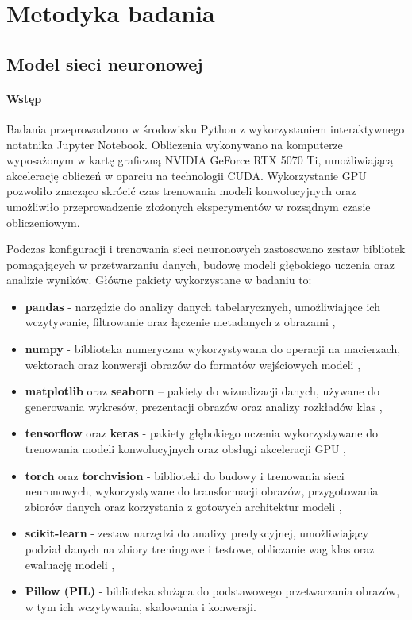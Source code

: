 
\def\filename{rozdzial4}
\chapter{Metodyka badania}

\section{Model sieci neuronowej}

\subsubsection{Wstęp}
Badania przeprowadzono w środowisku Python z wykorzystaniem interaktywnego notatnika Jupyter Notebook.
Obliczenia wykonywano na komputerze wyposażonym w kartę graficzną NVIDIA GeForce RTX 5070 Ti, umożliwiającą akcelerację obliczeń w oparciu na technologii CUDA. 
Wykorzystanie GPU pozwoliło znacząco skrócić czas trenowania modeli konwolucyjnych oraz umożliwiło przeprowadzenie złożonych eksperymentów w rozsądnym czasie obliczeniowym.
	
Podczas konfiguracji i trenowania sieci neuronowych zastosowano zestaw bibliotek pomagających w przetwarzaniu danych, budowę modeli głębokiego uczenia oraz analizie wyników. 
Główne pakiety wykorzystane w badaniu to:
\begin{itemize}
	\item \textbf{pandas} - narzędzie do analizy danych tabelarycznych, umożliwiające ich wczytywanie, filtrowanie oraz łączenie metadanych z obrazami \cite{pandas},
	\item \textbf{numpy} - biblioteka numeryczna wykorzystywana do operacji na macierzach, wektorach oraz konwersji obrazów do formatów wejściowych modeli \cite{Harris_2020},
	\item \textbf{matplotlib} oraz \textbf{seaborn} – pakiety do wizualizacji danych, używane do generowania wykresów, prezentacji obrazów oraz analizy rozkładów klas \cite{matplotlib, seaborn},
	\item \textbf{tensorflow} oraz \textbf{keras} - pakiety głębokiego uczenia wykorzystywane do trenowania modeli konwolucyjnych oraz obsługi akceleracji GPU \cite{abadi2016tensorflowlargescalemachinelearning},
	\item \textbf{torch} oraz \textbf{torchvision} - biblioteki do budowy i trenowania sieci neuronowych, wykorzystywane do transformacji obrazów, przygotowania zbiorów danych oraz korzystania z gotowych architektur modeli \cite{1874254, paszke2019pytorchimperativestylehighperformance},
	\item \textbf{scikit-learn} - zestaw narzędzi do analizy predykcyjnej, umożliwiający podział danych na zbiory treningowe i testowe, obliczanie wag klas oraz ewaluację modeli \cite{pedregosa2018scikitlearnmachinelearningpython},
	\item \textbf{Pillow (PIL)} - biblioteka służąca do podstawowego przetwarzania obrazów, w tym ich wczytywania, skalowania i konwersji.
\end{itemize}

